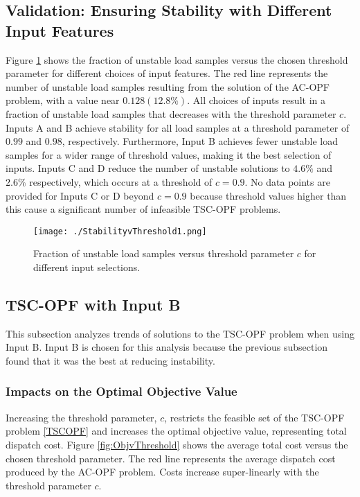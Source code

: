 \documentclass[lettersize,journal]{IEEEtran}
\begin{document}
\subsection{Validation: Ensuring Stability with Different Input Features}
Figure \ref{fig:stabilityvthreshold1} shows the fraction of unstable load samples versus the chosen threshold parameter for different choices of input features.  The red line represents the number of unstable load samples resulting from the solution of the AC-OPF problem, with a value near $0.128 (12.8\%)$.  All choices of inputs result in a fraction of unstable load samples that decreases with the threshold parameter $c$. Inputs A and B achieve stability for all load samples at a threshold parameter of $0.99$ and $0.98$, respectively. Furthermore, Input B achieves fewer unstable load samples for a wider range of threshold values, making it the best selection of inputs.  Inputs C and D reduce the number of unstable solutions to $4.6\%$ and $2.6\%$ respectively, which occurs at a threshold of $c=0.9$.  No data points are provided for Inputs C or D beyond $c=0.9$ because threshold values higher than this cause a significant number of infeasible TSC-OPF problems.  


\begin{figure}[h!]
    \centering
    \texttt{[image: ./StabilityvThreshold1.png]}
    \caption{Fraction of unstable load samples versus threshold parameter $c$ for different input selections.}
    \label{fig:stabilityvthreshold1}
\end{figure}


\subsection{TSC-OPF with Input B}
This subsection analyzes trends of solutions to the TSC-OPF problem when using Input B.  Input B is chosen for this analysis because the previous subsection found that it was the best at reducing instability.  %

\subsubsection{Impacts on the Optimal Objective Value}
Increasing the threshold parameter, $c$, restricts the feasible set of the TSC-OPF problem \eqref{TSCOPF} and increases the optimal objective value, representing total dispatch cost. Figure \ref{fig:ObjvThreshold} shows the average total cost versus the chosen threshold parameter.  The red line represents the average dispatch cost produced by the AC-OPF problem.  Costs increase super-linearly with the threshold parameter $c$.
\end{document}
